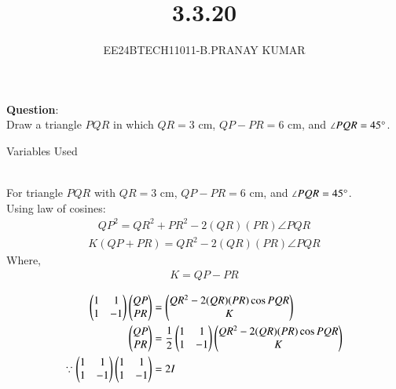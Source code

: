 \documentclass[journal]{IEEEtran}
\begin{document}

\vspace{3cm}

\title{3.3.20}
\author{EE24BTECH11011-B.PRANAY KUMAR
}
 \maketitle
{\let\newpage\relax\maketitle}

\renewcommand{\thefigure}{\theenumi}
\renewcommand{\thetable}{\theenumi}
\setlength{\intextsep}{10pt} %


\renewcommand{\thetable}{\theenumi}



\textbf{Question}:\\
Draw a triangle $PQR$ in which $QR = 3$ cm, $QP - PR = 6$ cm, and $\angle PQR = 45\degree$.\\

\solution
\begin{table}[h!]    
  \centering
  
  \caption{Variables Used}
  \label{tab 3.3.20}
\end{table}\\

For triangle $PQR$ with $QR = 3$ cm, $QP - PR = 6$ cm, and $\angle PQR = 45\degree$.\\
Using law of cosines:
\begin{align}
    QP^2 = QR^2 + PR^2 - 2(QR) (PR) \angle PQR 
\end{align}
\begin{align}
    K (QP+PR) = QR^2 - 2 (QR) (PR) \angle PQR 
\end{align}
Where,
\begin{align}
    K = QP-PR
\end{align}

\begin{align}
    \begin{pmatrix}1 & 1 \\ 1 & -1\end{pmatrix} \begin{pmatrix}QP\\ PR\end{pmatrix} &= \begin{pmatrix}QR^2 - 2(QR)(PR) \cos PQR \\ K\end{pmatrix} \\
    \begin{pmatrix}QP \\ PR\end{pmatrix} &= \frac{1}{2} \begin{pmatrix}1 & 1 \\ 1 & -1\end{pmatrix} \begin{pmatrix}QR^2 - 2(QR)(PR) \cos PQR \\ K\end{pmatrix} \\
    \because \begin{pmatrix}1 & 1 \\ 1 & -1\end{pmatrix} \begin{pmatrix}1 & 1 \\ 1 & -1\end{pmatrix} &= 2I
\end{align}
\end{document}
